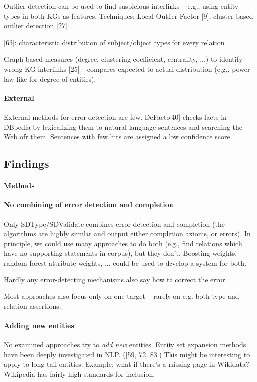 Outlier detection can be used to find suspicious interlinks -- e.g., using
entity types in both KGs as features.
Techniques: Local Outlier Factor [9], cluster-based outlier detection [27].

[63]: characteristic distribution of subject/object types for every relation

Graph-based measures (degree, clustering coefficient, centrality, ...) to
identify wrong KG interlinks [25] -- compares expected to actual distribution
(e.g., power-law-like for degree of entities).

\paragraph{External}
External methods for error detection are few.
DeFacto[40] checks facts in DBpedia by lexicalizing them to natural language
sentences and searching the Web ofr them. Sentences with few hits are assigned
a low confidence score.

\subsection{Findings}

\paragraph{Methods}

\paragraph{No combining of error detection and completion}
Only SDType/SDValidate combines error detection and completion (the algorithms
are highly similar and output either completion axioms, or errors).
In principle, we could use many approaches to do both (e.g., find relations
which have no supporting statements in corpus), but they don't.
Boosting weights, random forest attribute weights, ... could be used to develop
a system for both.

Hardly any error-detecting mechanisms also say how to correct the error.

Most approaches also focus only on one target -- rarely on e.g. both type and
relation assertions.

\paragraph{Adding new entities}
No examined approaches try to \textit{add new} entities. Entity set expansion
methods have been deeply investigated in NLP. ([59, 72, 83])
This might be interesting to apply to long-tail entities.
Example: what if there's a missing page in Wikidata? Wikipedia has fairly high
standards for inclusion.

